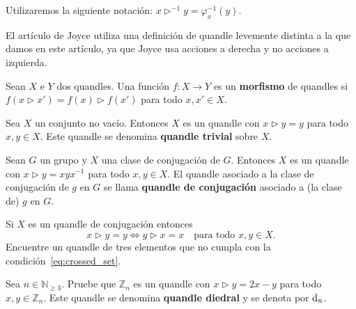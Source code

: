 \documentclass[graybox]{svmult}
\newcommand{\N}{\mathbb{N}}
\newcommand{\Z}{\mathbb{Z}}
\begin{document}
	Utilizaremos la siguiente notación: $x\triangleright^{-1}
	y=\varphi_x^{-1}(y)$. 

	El artículo de Joyce utiliza una definición de quandle levemente distinta a
	la que damos en este artículo, ya que Joyce usa acciones a derecha y no
	acciones a izquierda. 

	\begin{definition}
		Sean $X$ e $Y$ dos quandles. Una función $f\colon X\to Y$ es un
		\textbf{morfismo} de quandles si $f(x\triangleright x')=f(x)\triangleright
		f(x')$ para todo $x,x'\in X$.
	\end{definition}

\begin{example}
     Sea $X$ un conjunto no vacío. Entonces $X$ es un
    quandle con $x\triangleright y=y$ para todo $x,y\in X$. Este quandle se
    denomina \textbf{quandle trivial} sobre $X$.
\end{example}

\begin{example}
    Sean $G$ un grupo y $X$ una clase de conjugación de $G$. Entonces $X$ es un
    quandle con $x\triangleright y=xyx^{-1}$ para todo $x,y\in X$.  El quandle
    asociado a la clase de conjugación de $g$ en $G$ se llama \textbf{quandle
	de conjugación} asociado a (la clase de) $g$ en $G$.
\end{example}

\begin{exercise}
    Si $X$ es un quandle de conjugación entonces 
    \begin{equation}
        \label{eq:crossed_set}
        x\triangleright y=y\Longleftrightarrow y\triangleright x=x\quad\text{para todo $x,y\in X$}.
    \end{equation}
    Encuentre un quandle de tres elementos que no cumpla con la
    condición~\eqref{eq:crossed_set}. 
\end{exercise}

\begin{exercise}
	Sea $n\in\N_{\geq3}$. Pruebe que $\Z_n$ es un quandle con 
    $x\triangleright y=2x-y$ para todo $x,y\in\Z_n$. Este quandle se denomina
    \textbf{quandle diedral} y se denota por $\mathrm{d}_n$. 
\end{exercise}
\end{document}
